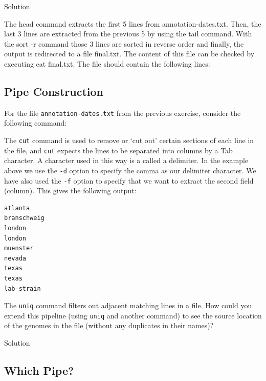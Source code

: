 \documentclass[
]{book}
\newenvironment{Shaded}{\begin{snugshade}}{\end{snugshade}}
\newcommand{\AttributeTok}[1]{\textcolor[rgb]{0.13,0.29,0.53}{#1}}
\newcommand{\ExtensionTok}[1]{#1}
\newcommand{\NormalTok}[1]{#1}
\begin{document}
Solution

The head command extracts the first 5 lines from annotation-dates.txt. Then, the last 3 lines are extracted from the previous 5 by using the tail command. With the sort -r command those 3 lines are sorted in reverse order and finally, the output is redirected to a file final.txt. The content of this file can be checked by executing cat final.txt. The file should contain the following lines:

\subsection{Pipe Construction}\label{pipe-construction}

For the file \texttt{annotation-dates.txt} from the previous exercise, consider the following command:

\begin{Shaded}
\end{Shaded}

The \texttt{cut} command is used to remove or `cut out' certain sections of each line in the file, and \texttt{cut} expects the lines to be separated into columns by a Tab character. A character used in this way is a called a delimiter. In the example above we use the \texttt{-d} option to specify the comma as our delimiter character. We have also used the \texttt{-f} option to specify that we want to extract the second field (column). This gives the following output:

\begin{verbatim}
atlanta
branschweig
london
london
muenster
nevada
texas
texas
lab-strain
\end{verbatim}

The \texttt{uniq} command filters out adjacent matching lines in a file. How could you extend this pipeline (using \texttt{uniq} and another command) to see the source location of the genomes in the file (without any duplicates in their names)?

Solution

\subsection{Which Pipe?}\label{which-pipe}
\end{document}

